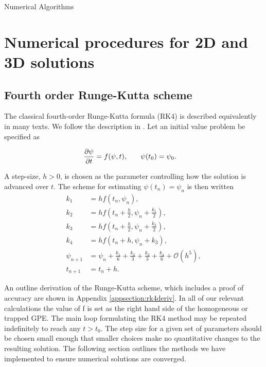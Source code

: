 \begin{chapter}{\label{cha:numerics}Numerical Algorithms}
\section{\label{section:RK} Numerical procedures for 2D and 3D solutions}
	\subsection{\label{section:RK4} Fourth order Runge-Kutta scheme}
	The classical fourth-order Runge-Kutta formula (RK4) is described equivalently in many texts. We follow the description in \cite{NumericalRecipes}. Let an initial value problem be specified as
	
	\begin{align*}
		\frac{\partial \psi}{\partial t} &= f(\psi,t),\hspace{0.25in}\psi(t_0) = \psi_0.
	\end{align*}

A step-size, $h>0$, is chosen as the parameter controlling how the solution is advanced over $t$. The scheme for estimating $\psi(t_n)= \psi_n$ is then written
\begin{equation}
\begin{split}
		k_1 &= hf(t_n,\psi_n),\\
		k_2 &= hf(t_n+\frac{h}{2},\psi_n+\frac{k_1}{2}),\\
		k_3 &= hf(t_n+\frac{h}{2},\psi_n+\frac{k_2}{2}),\\
		k_4 &= hf(t_n+h,\psi_n+k_3),\\
		\psi_{n+1} &= \psi_n + \frac{k_1}{6}+ \frac{k_2}{3}+ \frac{k_3}{3} + \frac{k_4}{6} + \mathcal{O}(h^5),\\
		t_{n+1}  &= t_n + h.
		\label{eq:rk4}
\end{split}
\end{equation}


	An outline derivation of the Runge-Kutta scheme, which includes a proof of accuracy are shown in Appendix \ref{appsection:rk4deriv}.
	In all of our relevant calculations the value of f is set as the right hand side of the homogeneous or trapped GPE. The main loop formulating the RK4 method may be repeated indefinitely to reach any $t>t_0$. The step size for a given set of parameters should be chosen small enough that smaller choices make no quantitative changes to the resulting solution. The following section outlines the methods we have implemented to ensure numerical solutions are converged.


\end{chapter}
